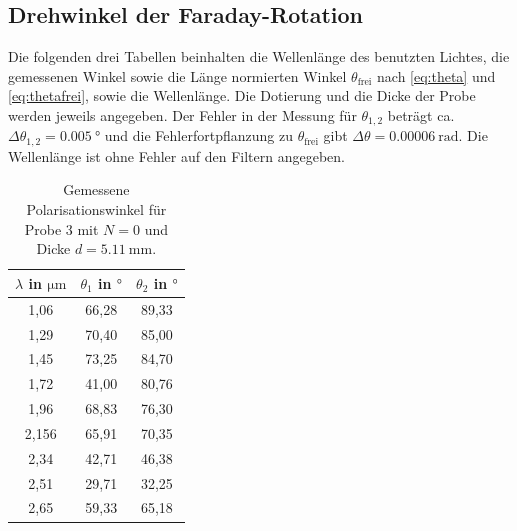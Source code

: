 
\subsection{Drehwinkel der Faraday-Rotation}
Die folgenden drei Tabellen beinhalten die Wellenlänge des benutzten Lichtes, die gemessenen Winkel sowie die Länge normierten Winkel $\theta_\text{frei}$ nach \autoref{eq:theta} und \autoref{eq:thetafrei}, sowie die Wellenlänge. Die Dotierung und die Dicke der Probe werden jeweils angegeben.
Der Fehler in der Messung für $\theta_{1,2}$ beträgt ca. $\Delta \theta_{1,2} = \qty{0.005}{\degree}$ und die Fehlerfortpflanzung zu $\theta_\text{frei}$ gibt $\Delta \theta = \qty{0.00006}{\radian}$.
Die Wellenlänge ist ohne Fehler auf den Filtern angegeben.

\begin{table}[H]
    \centering
    \caption{Gemessene Polarisationswinkel für Probe 3 mit $N = \num{0}$ und Dicke $d = \qty{5.11}{\milli\meter}$.}
    \label{tab:probe3}
    \begin{tabular}{c c c}
        \toprule
        {$\lambda$ in $\si{\micro\meter}$} & {$\theta_1$ in $\si{\degree}$} & {$\theta_2$ in $\si{\degree}$} \\
        \midrule
        1,06  & 66,28 & 89,33 \\
        1,29  & 70,40 & 85,00 \\
        1,45  & 73,25 & 84,70 \\
        1,72  & 41,00 & 80,76 \\
        1,96  & 68,83 & 76,30 \\
        2,156 & 65,91 & 70,35 \\
        2,34  & 42,71 & 46,38 \\
        2,51  & 29,71 & 32,25 \\
        2,65  & 59,33 & 65,18 \\   
        \bottomrule
    \end{tabular}
\end{table}

